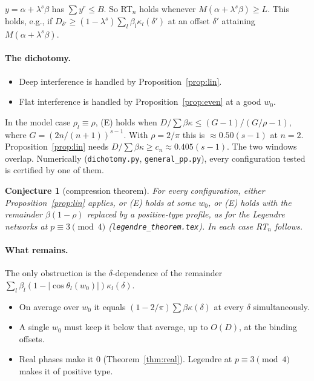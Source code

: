 \documentclass[11pt]{article}
\newtheorem{conjecture}[theorem]{Conjecture}
\theoremstyle{remark}\newtheorem{remark}[theorem]{Remark}
\begin{document}
\begin{proposition}\label{prop:lin}
$y=\alpha+\lambda^s\beta$ has $\sum y^r\le B$. So RT$_n$ holds whenever $M(\alpha+\lambda^s\beta)\ge L$. This holds, e.g.,
if $D_{\delta'}\ge(1-\lambda^s)\sum_l\beta_l\kappa_l(\delta')$ at an offset $\delta'$ attaining $M(\alpha+\lambda^s\beta)$.
\end{proposition}

\paragraph{The dichotomy.}
\begin{itemize}
\item Deep interference is handled by Proposition~\ref{prop:lin}.
\item Flat interference is handled by Proposition~\ref{prop:even} at a good $w_0$.
\end{itemize}
In the model case $\rho_l\equiv\rho$, (E) holds when $D/\sum\beta\kappa\le(G-1)/(G/\rho-1)$, where
$G=(2n/(n+1))^{s-1}$. With $\rho=2/\pi$ this is $\approx0.50(s-1)$ at $n=2$. Proposition~\ref{prop:lin} needs
$D/\sum\beta\kappa\ge c_n\approx0.405(s-1)$. The two windows overlap.
Numerically (\texttt{dichotomy.py}, \texttt{general\_pp.py}), every configuration tested is certified by one of them.

\begin{conjecture}[compression theorem]
For every configuration, either Proposition~\ref{prop:lin} applies, or (E) holds at some $w_0$, or (E) holds with the
remainder $\beta(1-\rho)$ replaced by a positive-type profile, as for the Legendre networks at $p\equiv3\pmod4$
(\texttt{legendre\_theorem.tex}). In each case RT$_n$ follows.
\end{conjecture}

\paragraph{What remains.} The only obstruction is the $\delta$-dependence of the remainder
$\sum_l\beta_l(1-|\cos\theta_l(w_0)|)\kappa_l(\delta)$.
\begin{itemize}
\item On average over $w_0$ it equals $(1-2/\pi)\sum\beta\kappa(\delta)$ at every $\delta$ simultaneously.
\item A single $w_0$ must keep it below that average, up to $O(D)$, at the binding offsets.
\item Real phases make it $0$ (Theorem~\ref{thm:real}). Legendre at $p\equiv3\pmod4$ makes it of positive type.
\end{itemize}
\end{document}
